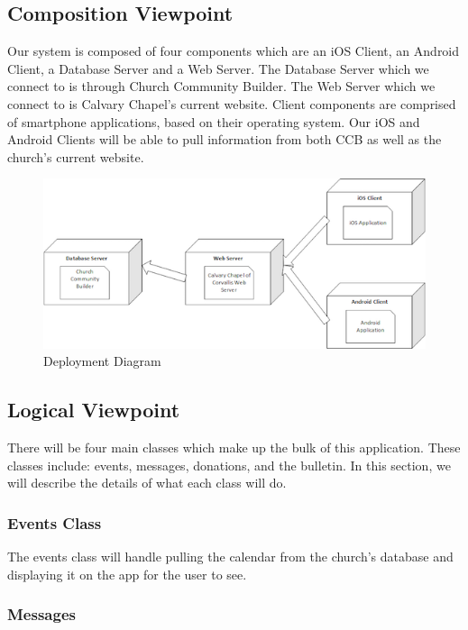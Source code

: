 \documentclass[letterpaper,10pt,draftclsnofoot,onecolumn,titlepage]{IEEEtran}
\begin{document}
		\subsection{Composition Viewpoint}
			Our system is composed of four components which are an iOS Client, an Android Client, a Database Server and a Web Server.
			The Database Server which we connect to is through Church Community Builder.
			The Web Server which we connect to is Calvary Chapel's current website.
			Client components are comprised of smartphone applications, based on their operating system.
			Our iOS and Android Clients will be able to pull information from both CCB as well as the church's current website.

		\begin{figure}[H]
			\centering
			\includegraphics[natwidth=552, natheight=245]{Deployment.png}
			\caption{Deployment Diagram}
			\label{fig:deployment}
		\end{figure}

		\subsection{Logical Viewpoint}
			There will be four main classes which make up the bulk of this application.
			These classes include: events, messages, donations, and the bulletin. 
			In this section, we will describe the details of what each class will do. 
			
			\subsubsection{Events Class}
				The events class will handle pulling the calendar from the church's database and displaying it on the app for the user to see. 
				
			\subsubsection{Messages}
			
\end{document}
